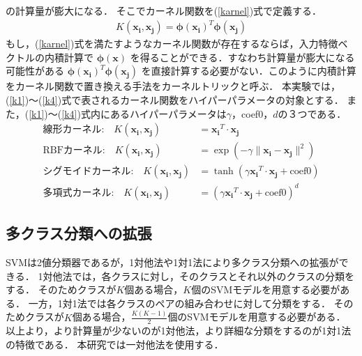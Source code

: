 の計算量が膨大になる．
そこでカーネル関数を(\ref{karnel})式で定義する．
\begin{align}
    \label{karnel}
  K( \boldsymbol{x_i}, \boldsymbol{x_j}) = \boldsymbol{\phi}(\boldsymbol{x_i})^T \boldsymbol{\phi}(\boldsymbol{x_j})
\end{align}
もし，(\ref{karnel})式を満たすようなカーネル関数が存在するならば，入力特徴ベクトルの内積計算で
$\boldsymbol{\phi}(\boldsymbol{x})$
を得ることができる．すなわち計算量が膨大になる可能性がある
$\boldsymbol{\phi}(\boldsymbol{x_i})^T \boldsymbol{\phi}(\boldsymbol{x_j})$
を直接計算する必要がない．このように内積計算をカーネル関数で置き換える手法をカーネルトリックと呼ぶ．
本実験では，(\ref{k1})〜(\ref{k4})式で表されるカーネル関数をハイパーパラメータの対象とする．
また，(\ref{k1})〜(\ref{k4})式内にあるハイパーパラメータは$\gamma$，coef0，$d$の３つである．
\begin{align}
    \text{線形カーネル:} \quad K(\boldsymbol{x_i}, \boldsymbol{x_j}) &= \boldsymbol{x_i}^T \cdot \boldsymbol{x_j}\label{k1} \\
    \text{RBFカーネル:} \quad K(\boldsymbol{x_i}, \boldsymbol{x_j}) &= \exp\left(-\gamma \| \boldsymbol{x_i} - \boldsymbol{x_j} \|^2\right)\label{k2} \\
    \text{シグモイドカーネル:} \quad K(\boldsymbol{x_i}, \boldsymbol{x_j}) &= \tanh(\gamma \boldsymbol{x_i}^T \cdot \boldsymbol{x_j} + \text{coef0}) \label{k3}\\
    \text{多項式カーネル:} \quad K(\boldsymbol{x_i}, \boldsymbol{x_j}) &= (\gamma\boldsymbol{x_i}^T \cdot \boldsymbol{x_j} + \text{coef0})^d\label{k4}
\end{align}
\subsection{多クラス分類への拡張}
SVMは2値分類器であるが，1対他法や1対1法により多クラス分類への拡張ができる．
1対他法では，各クラスに対し，そのクラスとそれ以外のクラスの分類をする．
そのためクラスが$K$個ある場合，$K$個のSVMモデルを用意する必要がある．
一方，1対1法では各クラスのペアの組み合わせに対して分類をする．
そのためクラスが$K$個ある場合，$\frac{K(K-1)}{2}$個のSVMモデルを用意する必要がある．
以上より，より計算量が少ないのが1対他法，より詳細な分類をするのが1対1法の特徴である．
本研究では一対他法を使用する．

